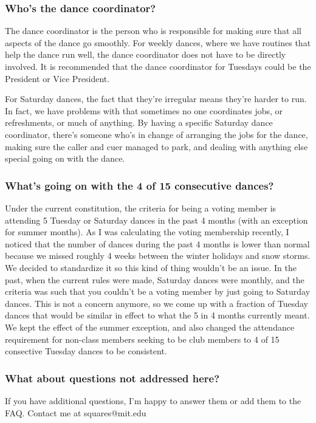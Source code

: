 \documentclass{article}
\begin{document}
\subsubsection*{Who's the dance coordinator?}
The dance coordinator is the person who is responsible for making sure that all aspects of the dance go smoothly. For weekly dances, where we have routines that help the dance run well, the dance coordinator does not have to be directly involved. It is recommended that the dance coordinator for Tuesdays could be the President or Vice President.

For Saturday dances, the fact that they're irregular means they're harder to run. In fact, we have problems with that sometimes no one coordinates jobs, or refreshments, or much of anything. By having a specific Saturday dance coordinator, there's someone who's in change of arranging the jobs for the dance, making sure the caller and cuer managed to park, and dealing with anything else special going on with the dance.

\subsubsection*{What's going on with the 4 of 15 consecutive dances?}
Under the current constitution, the criteria for being a voting member is attending 5 Tuesday or Saturday dances in the past 4 months (with an exception for summer months). As I was calculating the voting membership recently, I noticed that the number of dances during the past 4 months is lower than normal because we missed roughly 4 weeks between the winter holidays and snow storms. We decided to standardize it so this kind of thing wouldn't be an issue. In the past, when the current rules were made, Saturday dances were monthly, and the criteria was such that you couldn't be a voting member by just going to Saturday dances. This is not a concern anymore, so we come up with a fraction of Tuesday dances that would be similar in effect to what the 5 in 4 months currently meant. We kept the effect of the summer exception, and also changed the attendance requirement for non-class members seeking to be club members to 4 of 15 consective Tuesday dances to be consistent.

\subsubsection*{What about questions not addressed here?}
If you have additional questions, I'm happy to answer them or add them to the FAQ. Contact me at squares@mit.edu
\end{document}
